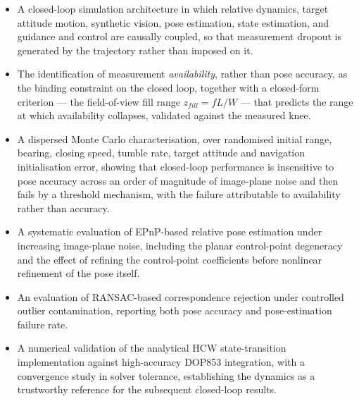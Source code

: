 \begin{itemize}
    \item A closed-loop simulation architecture in which relative dynamics,
    target attitude motion, synthetic vision, pose estimation, state
    estimation, and guidance and control are causally coupled, so that
    measurement dropout is generated by the trajectory rather than imposed
    on it.

    \item The identification of measurement \emph{availability}, rather than
    pose accuracy, as the binding constraint on the closed loop, together
    with a closed-form criterion --- the field-of-view fill range
    $z_{fill} = fL/W$ --- that predicts the range at which availability
    collapses, validated against the measured knee.

    \item A dispersed Monte Carlo characterisation, over randomised initial
    range, bearing, closing speed, tumble rate, target attitude and
    navigation initialisation error, showing that closed-loop performance is
    insensitive to pose accuracy across an order of magnitude of image-plane
    noise and then fails by a threshold mechanism, with the failure
    attributable to availability rather than accuracy.

    \item A systematic evaluation of EPnP-based relative pose estimation under
    increasing image-plane noise, including the planar control-point
    degeneracy and the effect of refining the control-point coefficients
    before nonlinear refinement of the pose itself.

    \item An evaluation of RANSAC-based correspondence rejection under
    controlled outlier contamination, reporting both pose accuracy and
    pose-estimation failure rate.

    \item A numerical validation of the analytical HCW state-transition
    implementation against high-accuracy DOP853 integration, with a
    convergence study in solver tolerance, establishing the dynamics as a
    trustworthy reference for the subsequent closed-loop results.
\end{itemize}
